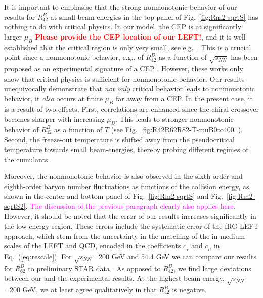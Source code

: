 \documentclass[%
reprint,
superscriptaddress,
showpacs,preprintnumbers,
amsmath,amssymb,
aps,
prd,
]{revtex4-1}
\def\Fig#1{Fig.~\ref{#1}} \def\Tab#1{Tab.~\ref{#1}}
\def\Eq#1{Eq.~(\ref{#1})}
\newcommand{\coljan}[1]{\textcolor{red}{#1}}
\newcommand{\colfab}[1]{\textcolor{magenta}{#1}}
\begin{document}
	It is important to emphasise that the strong nonmonotonic behavior of our results for $R^{B}_{42}$ at small  beam-energies in the top panel of \Fig{fig:Rm2-sqrtS} has nothing to do with critical physics. In our model, the CEP is at significantly larger $\mu_B$ \coljan{ \bf Please provide the CEP location of our LEFT!}, and it is well established that the critical region is only very small, see e.g.\ \cite{Schaefer:2006ds}. This is a crucial point since a nonmonotonic behavior, e.g., of $R^{B}_{42}$ as a function of $\sqrt{s_{NN}}$ has been proposed as an experimental signature of a CEP \cite{Stephanov:1999zu, Stephanov:2011pb}. However, these works only show that critical physics is sufficient for nonmonotonic behavior. Our results unequivocally demonstrate that \emph{not only} critical behavior  leads to nonmonotonic behavior, it \emph{also} occurs at finite $\mu_B$ far away from a CEP. In the present case, it is a result of two effects. First, correlations are enhanced since the chiral crossover becomes sharper with increasing $\mu_B$. This leads to stronger nonmonotonic behavior of $R^{B}_{42}$ as a function of $T$ (see \Fig{fig:R42R62R82-T-muB0to400}.). Second, the freeze-out temperature is shifted away from the pseudocritical temperature towards small beam-energies, thereby probing different regimes of the cumulants.
	
	
	Moreover, the nonmonotonic behavior is also observed in the sixth-order and eighth-order baryon number fluctuations as functions of the collision energy, as shown in the center and bottom panel of \Fig{fig:Rm2-sqrtS} and \Fig{fig:Rm2-sqrtS2}. 
	\colfab{The discussion of the previous paragraph clearly also applies here.}
	However, it should be noted that the error of our results increases significantly in the low energy region. These errors include the systematic error of the fRG-LEFT approach, which stem from the uncertainty in the matching of the in-medium scales of the LEFT and QCD, encoded in the coefficients $c_{_{T}}$ and $c_{\mu}$ in \Eq{eq:rescale}.
	For $\sqrt{s_{NN}}$=200 GeV and 54.4 GeV we can compare our results for $R^{B}_{62}$ to preliminary STAR data \cite{Nonaka:2020crv,Pandav:2020uzx}. As opposed to $R^{B}_{42}$, we find large deviations between our and the experimental results. At the highest beam energy, $\sqrt{s_{NN}}$=200 GeV, we at least agree qualitatively in that $R^{B}_{42}$ is negative.
	
	
	
	
	
	
\end{document}
